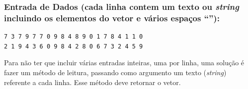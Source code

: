 \documentclass[12pt,a4paper]{article}
\begin{document}
\hypertarget{entrada-de-dados-cada-linha-contem-um-texto-ou-string-incluindo-os-elementos-do-vetor-e-vuxe1rios-espauxe7os}{%
\subsubsection{\texorpdfstring{Entrada de Dados (cada linha contem um
texto ou \emph{string} incluindo os elementos do vetor e vários espaços
``\texttt{}''):}{Entrada de Dados (cada linha contem um texto ou string incluindo os elementos do vetor e vários espaços ``''):}}\label{entrada-de-dados-cada-linha-contem-um-texto-ou-string-incluindo-os-elementos-do-vetor-e-vuxe1rios-espauxe7os}}

\begin{verbatim}
7 3 7 9 7 7 0 9 8 4 8 9 0 1 7 8 4 1 1 0
2 1 9 4 3 6 0 9 8 4 2 8 0 6 7 3 2 4 5 9
\end{verbatim}

Para não ter que incluir várias entradas inteiras, uma por linha, uma
solução é fazer um método de leitura, passando como argumento um texto
(\emph{string}) referente a cada linha. Esse método deve retornar o
vetor.
\end{document}
